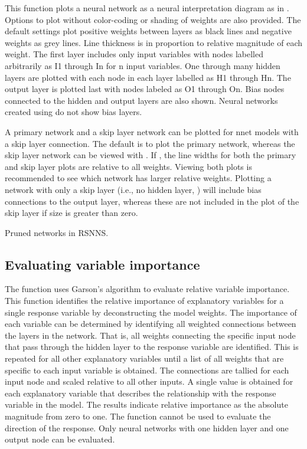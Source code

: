 \documentclass[article]{jss}\usepackage[]{graphicx}\usepackage[]{color}
\begin{document}
This function plots a neural network as a neural interpretation diagram as in \citet{Ozesmi99}. Options to plot without color-coding or shading of weights are also provided. The default settings plot positive weights between layers as black lines and negative weights as grey lines. Line thickness is in proportion to relative magnitude of each weight. The first layer includes only input variables with nodes labelled arbitrarily as I1 through In for n input variables. One through many hidden layers are plotted with each node in each layer labelled as H1 through Hn. The output layer is plotted last with nodes labeled as O1 through On. Bias nodes connected to the hidden and output layers are also shown. Neural networks created using  do not show bias layers.

A primary network and a skip layer network can be plotted for nnet models with a skip layer connection. The default is to plot the primary network, whereas the skip layer network can be viewed with . If , the line widths for both the primary and skip layer plots are relative to all weights. Viewing both plots is recommended to see which network has larger relative weights. Plotting a network with only a skip layer (i.e., no hidden layer, ) will include bias connections to the output layer, whereas these are not included in the plot of the skip layer if size is greater than zero.

Pruned networks in RSNNS.

\subsection{Evaluating variable importance}

The  function uses Garson's algorithm to evaluate relative variable importance. This function identifies the relative importance of explanatory variables for a single response variable by deconstructing the model weights. The importance of each variable can be determined by identifying all weighted connections between the layers in the network. That is, all weights connecting the specific input node that pass through the hidden layer to the response variable are identified. This is repeated for all other explanatory variables until a list of all weights that are specific to each input variable is obtained. The connections are tallied for each input node and scaled relative to all other inputs. A single value is obtained for each explanatory variable that describes the relationship with the response variable in the model. The results indicate relative importance as the absolute magnitude from zero to one. The function cannot be used to evaluate the direction of the response. Only neural networks with one hidden layer and one output node can be evaluated.
\end{document}

